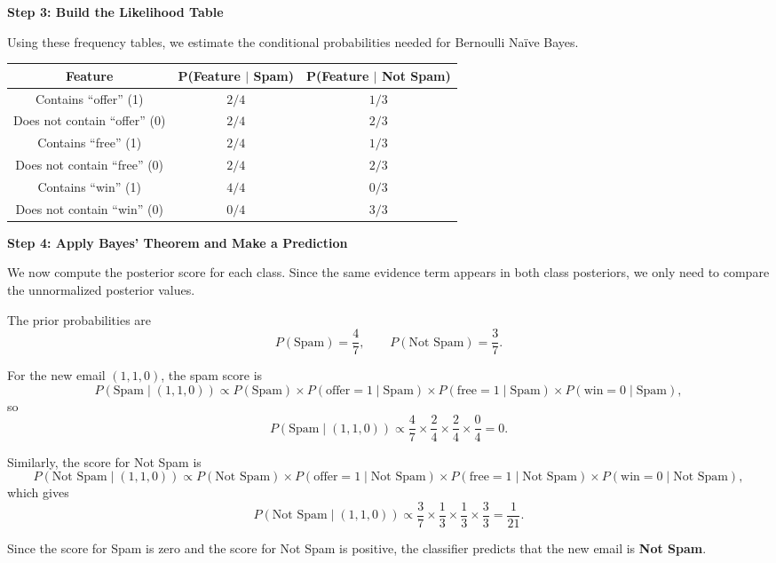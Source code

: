 \documentclass{article}
\begin{document}
\noindent \textbf{Step 3: Build the Likelihood Table}

Using these frequency tables, we estimate the conditional probabilities needed for Bernoulli Na\"ive Bayes.

\begin{center}
\begin{tabular}{|c|c|c|}
\hline
\textbf{Feature} & \textbf{P(Feature $\mid$ Spam)} & \textbf{P(Feature $\mid$ Not Spam)} \\
\hline
Contains ``offer'' (1) & \(2/4\) & \(1/3\) \\
Does not contain ``offer'' (0) & \(2/4\) & \(2/3\) \\
\hline
Contains ``free'' (1) & \(2/4\) & \(1/3\) \\
Does not contain ``free'' (0) & \(2/4\) & \(2/3\) \\
\hline
Contains ``win'' (1) & \(4/4\) & \(0/3\) \\
Does not contain ``win'' (0) & \(0/4\) & \(3/3\) \\
\hline
\end{tabular}
\end{center}

\noindent \textbf{Step 4: Apply Bayes' Theorem and Make a Prediction}

We now compute the posterior score for each class. Since the same evidence term appears in both class posteriors, we only need to compare the unnormalized posterior values.

The prior probabilities are
\[
P(\text{Spam}) = \frac{4}{7},
\qquad
P(\text{Not Spam}) = \frac{3}{7}.
\]

For the new email \( (1,1,0) \), the spam score is
\[
P(\text{Spam} \mid (1,1,0))
\propto
P(\text{Spam})
\times
P(\text{offer}=1 \mid \text{Spam})
\times
P(\text{free}=1 \mid \text{Spam})
\times
P(\text{win}=0 \mid \text{Spam}),
\]
so
\[
P(\text{Spam} \mid (1,1,0))
\propto
\frac{4}{7}\times\frac{2}{4}\times\frac{2}{4}\times\frac{0}{4}
= 0.
\]

Similarly, the score for Not Spam is
\[
P(\text{Not Spam} \mid (1,1,0))
\propto
P(\text{Not Spam})
\times
P(\text{offer}=1 \mid \text{Not Spam})
\times
P(\text{free}=1 \mid \text{Not Spam})
\times
P(\text{win}=0 \mid \text{Not Spam}),
\]
which gives
\[
P(\text{Not Spam} \mid (1,1,0))
\propto
\frac{3}{7}\times\frac{1}{3}\times\frac{1}{3}\times\frac{3}{3}
=
\frac{1}{21}.
\]

Since the score for Spam is zero and the score for Not Spam is positive, the classifier predicts that the new email is \textbf{Not Spam}.
\end{document}
